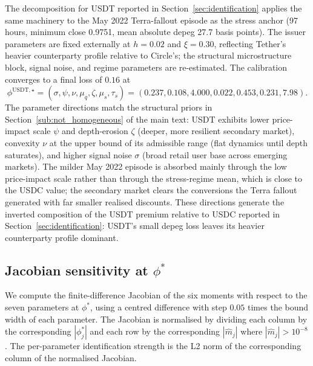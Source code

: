 The decomposition for USDT reported in Section~\ref{sec:identification} applies the same machinery to the May 2022 Terra-fallout episode as the stress anchor (97 hours, minimum close 0.9751, mean absolute depeg 27.7 basis points). The issuer parameters are fixed externally at $h = 0.02$ and $\xi = 0.30$, reflecting Tether's heavier counterparty profile relative to Circle's; the structural microstructure block, signal noise, and regime parameters are re-estimated. The calibration converges to a final loss of $0.16$ at
\begin{equation}\label{eq:phi_star_usdt}
\phi^{\text{USDT},\star} = (\sigma, \psi, \nu, \mu_q, \zeta, \mu_s, \tau_s) = (0.237, 0.108, 4.000, 0.022, 0.453, 0.231, 7.98).
\end{equation}
The parameter directions match the structural priors in Section~\ref{sub:not_homogeneous} of the main text: USDT exhibits lower price-impact scale $\psi$ and depth-erosion $\zeta$ (deeper, more resilient secondary market), convexity $\nu$ at the upper bound of its admissible range (flat dynamics until depth saturates), and higher signal noise $\sigma$ (broad retail user base across emerging markets). The milder May 2022 episode is absorbed mainly through the low price-impact scale rather than through the stress-regime mean, which is close to the USDC value; the secondary market clears the conversions the Terra fallout generated with far smaller realised discounts. These directions generate the inverted composition of the USDT premium relative to USDC reported in Section~\ref{sec:identification}: USDT's small depeg loss leaves its heavier counterparty profile dominant.

\subsection{Jacobian sensitivity at $\phi^*$}\label{sub:jacobian}

We compute the finite-difference Jacobian of the six moments with respect to the seven parameters at $\phi^*$, using a centred difference with step $0.05$ times the bound width of each parameter. The Jacobian is normalised by dividing each column by the corresponding $|\phi^*_j|$ and each row by the corresponding $|\hat m_j|$ where $|\hat m_j| > 10^{-8}$. The per-parameter identification strength is the L2 norm of the corresponding column of the normalised Jacobian.

